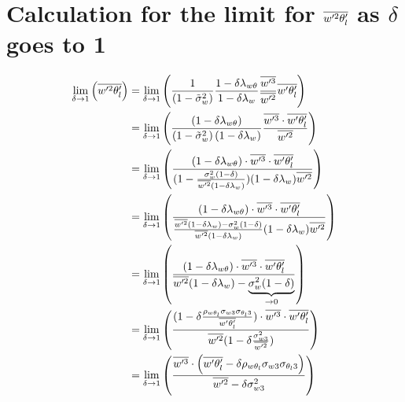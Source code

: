 \section{Calculation for the limit for \texorpdfstring{$\overline{w'^2 \theta_l'}$}{wprime2thetalbar} as \texorpdfstring{$\delta$}{delta} goes to 1}
\label{sec:calculation-for-the-limit-for-wprime2thetalbar-as-delta-goes-to-1}

\begin{align}
    \label{eq:limit_wprime2thetalbar_delta_to_1}
    \lim_{\delta \to 1}\left(\overline{w'^2 \theta_l'}\right)
    &= \lim_{\delta \to 1}\left(
    \frac{1}{\left( 1 - \tilde{\sigma}_w^2 \right)}
    \frac{1 - \delta \lambda_{w\theta}}{1-\delta \lambda_w}
    \frac{\overline{w'^3}}{\overline{w'^2}} \overline{w'\theta_l'}
    \right)
    \\
    &= \lim_{\delta \to 1}\left(
    \frac{(1 - \delta \lambda_{w\theta})}
    {\left( 1 - \tilde{\sigma}_w^2 \right)(1-\delta \lambda_w)}
    \frac{\overline{w'^3} \cdot \overline{w'\theta_l'}}{\overline{w'^2}}
    \right)
    \\
    &= \lim_{\delta \to 1}\left(
    \frac{(1 - \delta \lambda_{w\theta}) \cdot \overline{w'^3} \cdot \overline{w'\theta_l'}}
    {(1 - \frac{\sigma_w^2 (1-\delta)}{\overline{w'^2}(1-\delta\lambda_w)})(1-\delta \lambda_w)\overline{w'^2}}
    \right)
    \\
    &= \lim_{\delta \to 1}\left(
    \frac{(1 - \delta \lambda_{w\theta}) \cdot \overline{w'^3} \cdot \overline{w'\theta_l'}}
    {\frac{\overline{w'^2}(1-\delta\lambda_w) - \sigma_w^2 (1-\delta)}
    {\overline{w'^2}(1-\delta\lambda_w)}
        (1-\delta \lambda_w) \overline{w'^2}}
    \right)
    \\
    &= \lim_{\delta \to 1}\left(
    \frac{(1 - \delta \lambda_{w\theta}) \cdot \overline{w'^3} \cdot \overline{w'\theta_l'}}
    {\overline{w'^2}(1-\delta\lambda_w) - \underbrace{\sigma_w^2 (1-\delta)}_{\to 0}}
    \right)
    \\
    &= \lim_{\delta \to 1}\left(
    \frac{(1 - \delta \frac{\rho_{w \theta_l} \sigma_{w 3} \sigma_{\theta_l 3}}{\overline{w' \theta_l'}}) \cdot \overline{w'^3} \cdot \overline{w'\theta_l'}}
    {\overline{w'^2}(1-\delta \frac{\sigma_{w 3}^2}{\overline{w'^2}})}
    \right)
    \\
    &= \lim_{\delta \to 1}\left(
    \frac{\overline{w'^3} \cdot \left(\overline{w'\theta_l'} - \delta \rho_{w \theta_l} \sigma_{w 3} \sigma_{\theta_l 3}\right)}
    {\overline{w'^2} - \delta \sigma_{w 3}^2}
    \right)
\end{align}